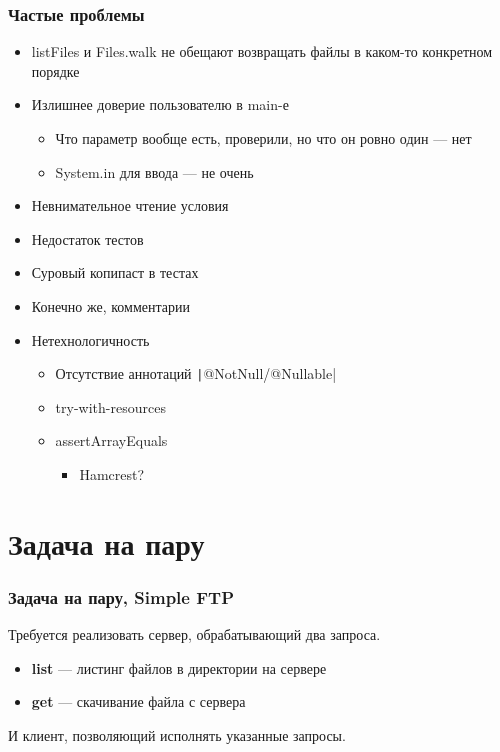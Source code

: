 \documentclass[xetex,mathserif,serif]{beamer}
\begin{document}
	\begin{frame}
		\frametitle{Частые проблемы}
		\begin{itemize}
			\item listFiles и Files.walk не обещают возвращать файлы в каком-то конкретном порядке
			\item Излишнее доверие пользователю в main-е
			\begin{itemize}
				\item Что параметр вообще есть, проверили, но что он ровно один --- нет
				\item System.in для ввода --- не очень 
			\end{itemize}
			
			
			\item Невнимательное чтение условия
			\item Недостаток тестов
			\item Суровый копипаст в тестах
			\item Конечно же, комментарии
			\item Нетехнологичность
			\begin{itemize}
				\item Отсутствие аннотаций \texttt|@NotNull/@Nullable|
				\item try-with-resources
				\item assertArrayEquals
				\begin{itemize}
					\item Hamcrest?
				\end{itemize}
			\end{itemize}
		\end{itemize}
	\end{frame}

	\section{Задача на пару}

	\begin{frame}
		\frametitle{Задача на пару, Simple FTP}
		Требуется реализовать сервер, обрабатывающий два запроса.
		\begin{itemize}
			\item \textbf{list} --- листинг файлов в директории на сервере
			\item \textbf{get} --- скачивание файла с сервера
		\end{itemize}
		И клиент, позволяющий исполнять указанные запросы.
	\end{frame}
\end{document}

